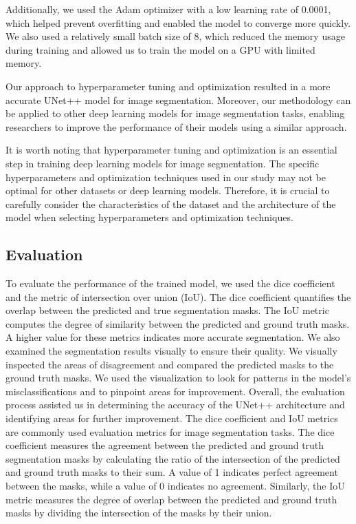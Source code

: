\documentclass[conference]{IEEEtran}
\begin{document}
Additionally, we used the Adam optimizer with a low learning rate of 0.0001, which helped prevent overfitting and enabled the model to converge more quickly. We also used a relatively small batch size of 8, which reduced the memory usage during training and allowed us to train the model on a GPU with limited memory.

Our approach to hyperparameter tuning and optimization resulted in a more accurate UNet++ model for image segmentation. Moreover, our methodology can be applied to other deep learning models for image segmentation tasks, enabling researchers to improve the performance of their models using a similar approach.

It is worth noting that hyperparameter tuning and optimization is an essential step in training deep learning models for image segmentation. The specific hyperparameters and optimization techniques used in our study may not be optimal for other datasets or deep learning models. Therefore, it is crucial to carefully consider the characteristics of the dataset and the architecture of the model when selecting hyperparameters and optimization techniques.
\subsection{Evaluation}\label{SCM}
To evaluate the performance of the trained model, we used the dice coefficient and the metric of intersection over union (IoU). The dice coefficient quantifies the overlap between the predicted and true segmentation masks. The IoU metric computes the degree of similarity between the predicted and ground truth masks. A higher value for these metrics indicates more accurate segmentation.
We also examined the segmentation results visually to ensure their quality. We visually inspected the areas of disagreement and compared the predicted masks to the ground truth masks. We used the visualization to look for patterns in the model's misclassifications and to pinpoint areas for improvement. Overall, the evaluation process assisted us in determining the accuracy of the UNet++ architecture and identifying areas for further improvement.
The dice coefficient and IoU metrics are commonly used evaluation metrics for image segmentation tasks. The dice coefficient measures the agreement between the predicted and ground truth segmentation masks by calculating the ratio of the intersection of the predicted and ground truth masks to their sum. A value of 1 indicates perfect agreement between the masks, while a value of 0 indicates no agreement. Similarly, the IoU metric measures the degree of overlap between the predicted and ground truth masks by dividing the intersection of the masks by their union.
\end{document}
